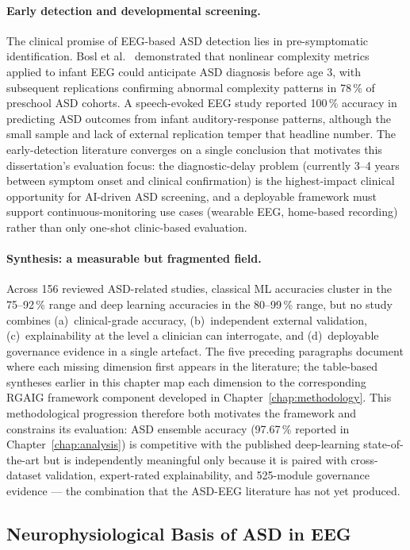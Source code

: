 \paragraph{Early detection and developmental screening.}
The clinical promise of EEG-based ASD detection lies in pre-symptomatic identification. Bosl et al.~\cite{bosl2018eeg} demonstrated that nonlinear complexity metrics applied to infant EEG could anticipate ASD diagnosis before age 3, with subsequent replications confirming abnormal complexity patterns in 78\,\% of preschool ASD cohorts. A speech-evoked EEG study reported 100\,\% accuracy in predicting ASD outcomes from infant auditory-response patterns, although the small sample and lack of external replication temper that headline number. The early-detection literature converges on a single conclusion that motivates this dissertation's evaluation focus: the diagnostic-delay problem (currently 3--4 years between symptom onset and clinical confirmation) is the highest-impact clinical opportunity for AI-driven ASD screening, and a deployable framework must support continuous-monitoring use cases (wearable EEG, home-based recording) rather than only one-shot clinic-based evaluation.

\paragraph{Synthesis: a measurable but fragmented field.}
Across 156 reviewed ASD-related studies, classical ML accuracies cluster in the 75--92\,\% range and deep learning accuracies in the 80--99\,\% range, but no study combines (a)~clinical-grade accuracy, (b)~independent external validation, (c)~explainability at the level a clinician can interrogate, and (d)~deployable governance evidence in a single artefact. The five preceding paragraphs document where each missing dimension first appears in the literature; the table-based syntheses earlier in this chapter map each dimension to the corresponding RGAIG framework component developed in Chapter~\ref{chap:methodology}. This methodological progression therefore both motivates the framework and constrains its evaluation: ASD ensemble accuracy (97.67\,\% reported in Chapter~\ref{chap:analysis}) is competitive with the published deep-learning state-of-the-art but is independently meaningful only because it is paired with cross-dataset validation, expert-rated explainability, and 525-module governance evidence --- the combination that the ASD-EEG literature has not yet produced.

\subsection{Neurophysiological Basis of ASD in EEG}
\label{subsec:asd_neurophysiology}

